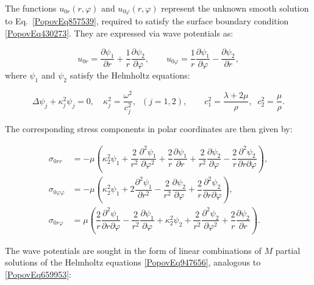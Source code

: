 The functions $u_{0r}(r, \varphi)$ and $u_{0\varphi}(r, \varphi)$ represent the unknown smooth solution to Eq.~\eqref{PopovEq857539}, required to satisfy the surface boundary condition \eqref{PopovEq430273}. They are expressed via wave potentials \cite{Popov1} as:

\begin{equation} \label{31.47)}
	u_{0r} = \dfrac{\partial \psi_1}{\partial r} + \dfrac{1}{r} \dfrac{\partial \psi_2}{\partial \varphi}, \qquad
	u_{0\varphi} = \dfrac{1}{r} \dfrac{\partial \psi_1}{\partial \varphi} - \dfrac{\partial \psi_2}{\partial r},
\end{equation}
where $\psi_1$ and $\psi_2$ satisfy the Helmholtz equations:

\begin{equation} \label{PopovEq947656}
	\Delta \psi_j + \kappa_j^2 \psi_j = 0, \quad \kappa_j^2 = \dfrac{\omega^2}{c_j^2}, \;\;
	(j = 1,2), \qquad
	c_1^2 = \dfrac{\lambda + 2\mu}{\rho}, \;\; c_2^2 = \dfrac{\mu}{\rho}.
\end{equation}

The corresponding stress components in polar coordinates are then given by:

\begin{equation} \label{PopovEq359974}
	\begin{aligned}
		\sigma_{0rr} &= -\mu \left( \kappa_2^2 \psi_1 + \dfrac{2}{r^2} \dfrac{\partial^2 \psi_1}{\partial \varphi^2}
		+ \dfrac{2}{r} \dfrac{\partial \psi_1}{\partial r}
		+ \dfrac{2}{r^2} \dfrac{\partial \psi_2}{\partial \varphi}
		- \dfrac{2}{r} \dfrac{\partial^2 \psi_2}{\partial r \partial \varphi} \right),
		\\
		\sigma_{0\varphi\varphi} &= -\mu \left( \kappa_2^2 \psi_1
		+ 2 \dfrac{\partial^2 \psi_1}{\partial r^2}
		- \dfrac{2}{r^2} \dfrac{\partial \psi_2}{\partial \varphi}
		+ \dfrac{2}{r} \dfrac{\partial^2 \psi_2}{\partial r \partial \varphi} \right),
		\\
		\sigma_{0r\varphi} &= \mu \left(
		\dfrac{2}{r} \dfrac{\partial^2 \psi_1}{\partial r \partial \varphi}
		- \dfrac{2}{r^2} \dfrac{\partial \psi_1}{\partial \varphi}
		+ \kappa_2^2 \psi_2
		+ \dfrac{2}{r^2} \dfrac{\partial^2 \psi_2}{\partial \varphi^2}
		+ \dfrac{2}{r} \dfrac{\partial \psi_2}{\partial r}
		\right).
	\end{aligned}
\end{equation}

	The wave potentials are sought in the form of linear combinations of $M$ partial solutions of the Helmholtz equations \eqref{PopovEq947656}, analogous to \eqref{PopovEq659953}:
	

